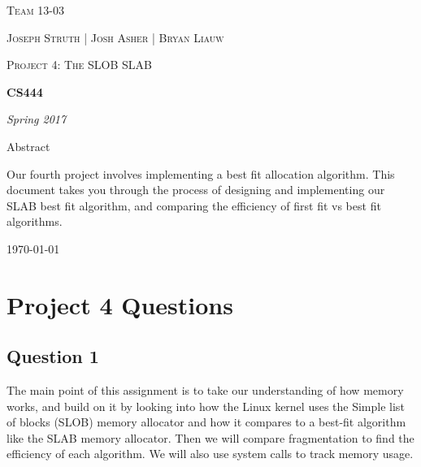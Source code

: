 \documentclass[10pt,draftclsnofoot,onecolumn, compsoc]{IEEEtran}
\begin{document}
\begin{titlepage}
	\centering
	{\scshape\LARGE Team 13-03 \par}
	\vspace{1cm}
	{\scshape\Large Joseph Struth  |  Josh Asher  |   Bryan Liauw\par}
    \vspace{1cm}
    	{\scshape\Large Project 4: The SLOB SLAB \par}
	\vspace{1.5cm}
	{\huge\bfseries CS444\par}
	\vspace{2cm}
	{\Large\itshape Spring 2017\par}
	\vspace{4cm}
	{\large Abstract\par}
	\vspace{1cm}
	Our fourth project involves implementing a best fit allocation algorithm.
	This document takes you through the process of designing and implementing our SLAB best fit algorithm, and comparing the efficiency of first fit vs best fit algorithms.
	\vfill

	{\large \today\par}
\end{titlepage}


%
%


\section{Project 4 Questions}
\subsection{Question 1}
The main point of this assignment is to take our understanding of how memory works, and build on it by looking into how the Linux kernel uses the Simple list of blocks (SLOB) memory allocator and how it compares to a best-fit algorithm like the SLAB memory allocator. Then we will compare fragmentation to find the efficiency of each algorithm. We will also use system calls to track memory usage.
\end{document}
